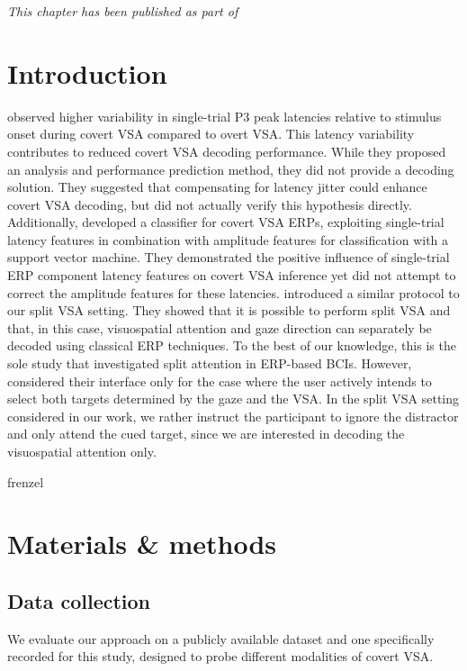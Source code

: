 \emph{This chapter has been published as part of~\textcite{VanDenKerchove2024}}

\section{Introduction}

\cite{Arico2014} observed higher variability in single-trial P3 peak
latencies relative to stimulus onset during covert VSA compared to overt VSA.
This latency variability contributes to reduced covert VSA decoding performance.
While they proposed an analysis and performance prediction method, they did not provide a
decoding solution.
They suggested that compensating for latency jitter could enhance covert VSA
decoding, but did not actually verify this hypothesis directly.
Additionally, \cite{hardiansyah2020single} developed a classifier for
covert VSA ERPs, exploiting single-trial latency features in combination with
amplitude features for classification with a support vector machine.
They demonstrated the positive influence of single-trial ERP component latency
features on covert VSA inference yet did not attempt to correct the amplitude
features for these latencies.
\cite{Frenzel2011} introduced a similar protocol to our split VSA
setting.
They showed that it is possible to perform split VSA and that, in this
case, visuospatial attention and gaze direction can separately be decoded using
classical ERP techniques.
To the best of our
knowledge, this is the sole study that investigated split attention in ERP-based BCIs.
However, \cite{Frenzel2011} considered their interface only for the case
where the user actively intends to select both targets determined by the gaze
and the VSA.
In the split VSA setting considered in our work, we rather instruct the participant to ignore
the distractor and only attend the cued target, since we are interested in
decoding the visuospatial attention only.


frenzel

\section{Materials \& methods}

\subsection{Data collection}
We evaluate our approach on a
publicly available dataset and one specifically recorded for this study, designed to
probe different modalities of covert VSA.

